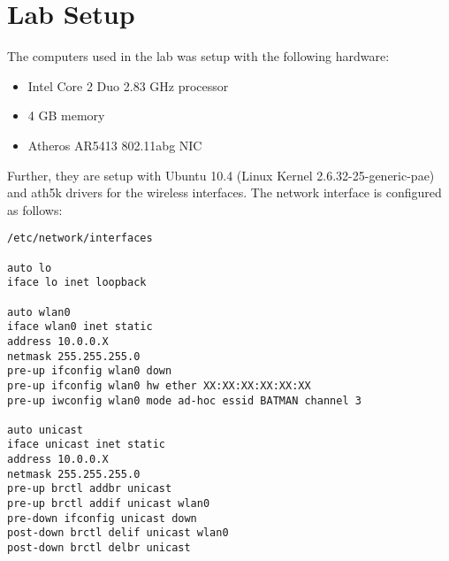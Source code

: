 \chapter{Lab Setup}
\label{appendix:lab_setup}

The computers used in the lab was setup with the following hardware:

\begin{itemize}
\item Intel Core 2 Duo 2.83 GHz processor
\item 4 GB memory
\item Atheros AR5413 802.11abg NIC
\end{itemize}

\noindent
Further, they are setup with Ubuntu 10.4 (Linux Kernel 2.6.32-25-generic-pae) and ath5k drivers for the wireless interfaces. The network interface is configured as follows:


\begin{lstlisting}[frame=tb]
/etc/network/interfaces

auto lo
iface lo inet loopback

auto wlan0
iface wlan0 inet static
address 10.0.0.X
netmask 255.255.255.0
pre-up ifconfig wlan0 down
pre-up ifconfig wlan0 hw ether XX:XX:XX:XX:XX:XX
pre-up iwconfig wlan0 mode ad-hoc essid BATMAN channel 3

auto unicast
iface unicast inet static
address 10.0.0.X
netmask 255.255.255.0
pre-up brctl addbr unicast
pre-up brctl addif unicast wlan0
pre-down ifconfig unicast down
post-down brctl delif unicast wlan0
post-down brctl delbr unicast
\end{lstlisting}

